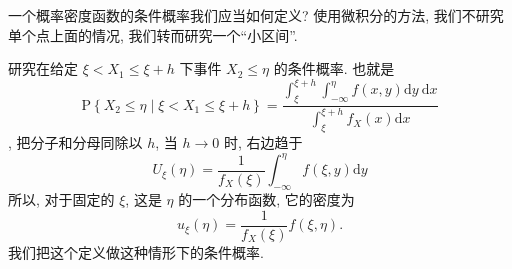 一个概率密度函数的条件概率我们应当如何定义? 使用微积分的方法, 我们不研究单个点上面的情况, 我们转而研究一个``小区间''.

研究在给定 $\xi<X_1 \leq \xi+h$ 下事件 $X_2 \leq \eta$ 的条件概率. 也就是$$\mathrm{P}\left\{X_2 \leq \eta \mid \xi<X_1 \leq \xi+h\right\}=\frac{\int_{\xi}^{\xi+h}  \int_{-\infty}^\eta f(x, y) \mathrm{d} y\mathrm{~d} x}{\int_{\xi}^{\xi+h} f_X(x) \mathrm{d} x}$$, 把分子和分母同除以 $h$, 当 $h \rightarrow 0$ 时, 右边趋于$$U_{\xi}(\eta)=\frac{1}{f_X(\xi)} \int_{-\infty}^\eta f(\xi, y) \mathrm{d} y$$
所以, 对于固定的 $\xi$, 这是 $\eta$ 的一个分布函数, 它的密度为$$u_{\xi}(\eta)=\frac{1}{f_X(\xi)} f(\xi, \eta).$$ 我们把这个定义做这种情形下的条件概率. 

